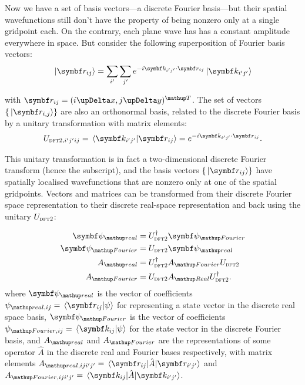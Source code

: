 Now we have a set of basis vectors---a discrete Fourier basis---but their spatial wavefunctions still don't have the property of being nonzero only at a single gridpoint each. On the contrary, each plane wave has has a constant amplitude everywhere in space. But consider the following superposition of Fourier basis vectors:
\begin{align}\label{eq:DFT_basischange}
\ket{\vec r_{ij}} = \sum_{i^\prime}\sum_{j^\prime} e^{-i \vec k_{i^\prime j^\prime} \cdot \vec r_{i j}}\ket{\vec k_{i^\prime j^\prime}}
\end{align}

with $\vec r_{i j} = (i \upDelta x, j \upDelta y)^\up{T}$. The set of vectors $\{\ket{\vec r_{i, j}}\}$ are also an orthonormal basis, related to the discrete Fourier basis by a unitary transformation with matrix elements:
\begin{align}
U_{\textsc{dft2}, i^\prime j^\prime ij} = \braket{\vec k_{i^\prime j^\prime}}{\vec r_{i j}} = e^{-i \vec k_{i^\prime j^\prime} \cdot \vec r_{i j}}.
\end{align}

This unitary transformation is in fact a two-dimensional discrete Fourier transform (hence the subscript), and the basis vectors $\{\ket{\vec r_{ij}}\}$ have spatially localised wavefunctions that are nonzero only at one of the spatial gridpoints. Vectors and matrices can be transformed from their discrete Fourier space representation to their discrete real-space representation and back using the unitary $U_{\textsc{dft2}}$:

\begin{align}
\vec\psi_\up{real} &= U^\dagger_{\textsc{dft2}} \vec \psi_\up{Fourier}\\
\vec\psi_\up{Fourier} &= U_{\textsc{dft2}} \vec \psi_\up{real}\\
A_\up{real} &= U^\dagger_{\textsc{dft2}} A_\up{Fourier} U_{\textsc{dft2}}\\
A_\up{Fourier} &= U_{\textsc{dft2}} A_\up{Real} U^\dagger_{\textsc{dft2}}.
\end{align}
where $\vec\psi_\up{real}$ is the vector of coefficients $\psi_{\up{real},ij}= \braket{\vec r_{ij}}{\psi}$ for representing a state vector in the discrete real space basis, $\vec\psi_\up{Fourier}$ is the vector of coefficients $\psi_{\up{Fourier}, ij} = \braket{\vec k_{ij}}{\psi}$ for the state vector in the discrete Fourier basis, and $A_\up{real}$ and $A_\up{Fourier}$ are the representations of some operator $\hat A$ in the discrete real and Fourier bases respectively, with matrix elements $A_{\up{real}, ij i^\prime j^\prime} = \matrixel{\vec r_{ij}}{\hat A}{\vec r_{i^\prime j^\prime}}$ and $A_{\up{Fourier},ij i^\prime j^\prime} = \matrixel{\vec k_{ij}}{\hat A}{\vec k_{i^\prime j^\prime}}$.

